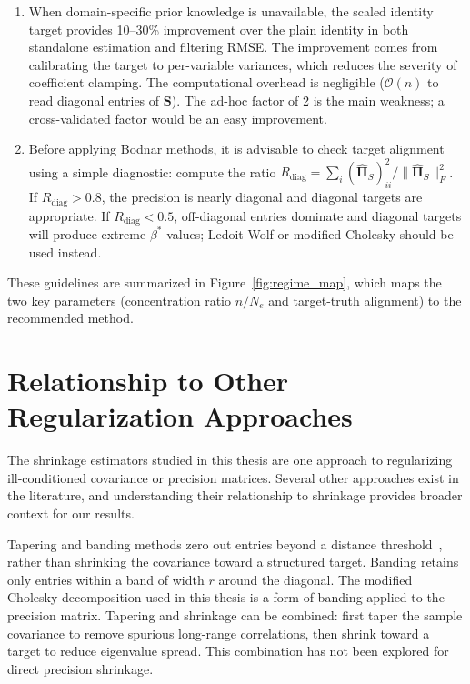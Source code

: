 \begin{enumerate}
\item When domain-specific prior knowledge is unavailable, the scaled identity target provides 10--30\% improvement over the plain identity in both standalone estimation and filtering RMSE. The improvement comes from calibrating the target to per-variable variances, which reduces the severity of coefficient clamping. The computational overhead is negligible ($\mathcal{O}(n)$ to read diagonal entries of $\mathbf{S}$). The ad-hoc factor of 2 is the main weakness; a cross-validated factor would be an easy improvement.

\item Before applying Bodnar methods, it is advisable to check target alignment using a simple diagnostic: compute the ratio $R_{\text{diag}} = \sum_i (\hat{\boldsymbol{\Pi}}_S)_{ii}^2 / \|\hat{\boldsymbol{\Pi}}_S\|_F^2$. If $R_{\text{diag}} > 0.8$, the precision is nearly diagonal and diagonal targets are appropriate. If $R_{\text{diag}} < 0.5$, off-diagonal entries dominate and diagonal targets will produce extreme $\beta^*$ values; Ledoit-Wolf or modified Cholesky should be used instead.
\end{enumerate}

These guidelines are summarized in Figure~\ref{fig:regime_map}, which maps the two key parameters (concentration ratio $n/N_e$ and target-truth alignment) to the recommended method.

\section{Relationship to Other Regularization Approaches}
\label{sec:disc_other}

The shrinkage estimators studied in this thesis are one approach to regularizing ill-conditioned covariance or precision matrices. Several other approaches exist in the literature, and understanding their relationship to shrinkage provides broader context for our results.

Tapering and banding methods zero out entries beyond a distance threshold~\citep{gaspari1999construction}, rather than shrinking the covariance toward a structured target. Banding retains only entries within a band of width $r$ around the diagonal. The modified Cholesky decomposition used in this thesis is a form of banding applied to the precision matrix. Tapering and shrinkage can be combined: first taper the sample covariance to remove spurious long-range correlations, then shrink toward a target to reduce eigenvalue spread. This combination has not been explored for direct precision shrinkage.

